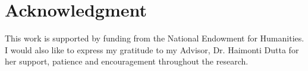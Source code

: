 \documentclass[letterpaper]{article}
\begin{document}
\section*{Acknowledgment}
This work is supported by funding from the National Endowment for Humanities. I would also like to express my gratitude to my Advisor, Dr. Haimonti Dutta for her support, patience and encouragement throughout the research.\\


\begin{quote}
\begin{small}


\end{small}
\end{quote}

%
%
%
\end{document}
